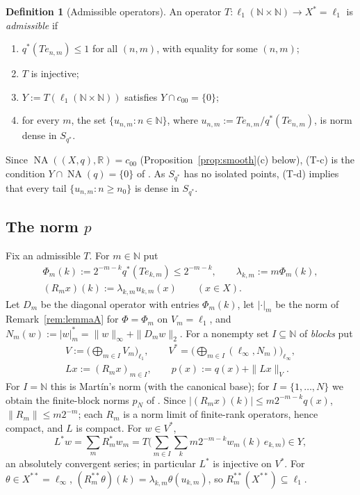 \documentclass[10pt]{amsart}
\theoremstyle{definition}
\newtheorem{definition}[theorem]{Definition}
\theoremstyle{remark}
\newcommand{\NA}{\operatorname{NA}}
\newcommand{\R}{\mathbb R}
\newcommand{\N}{\mathbb N}
\begin{document}
\begin{definition}[Admissible operators]\label{def:admissible}
An operator $T:\ell_1(\N\times\N)\to X^*=\ell_1$ is \emph{admissible} if
\begin{enumerate}
\item[(T-a)] $q^*(Te_{n,m})\le1$ for all $(n,m)$, with equality for some
$(n,m)$;
\item[(T-b)] $T$ is injective;
\item[(T-c)] $Y:=T(\ell_1(\N\times\N))$ satisfies $Y\cap c_{00}=\{0\}$;
\item[(T-d)] for every $m$, the set $\{u_{n,m}:n\in\N\}$, where
$u_{n,m}:=Te_{n,m}/q^*(Te_{n,m})$, is norm dense in $S_{q^*}$.
\end{enumerate}
\end{definition}

Since $\NA((X,q),\R)=c_{00}$ (Proposition~\ref{prop:smooth}(c) below),
(T-c) is the condition $Y\cap\NA(q)=\{0\}$ of \cite{Martin}.  As $S_{q^*}$
has no isolated points, (T-d) implies that every tail
$\{u_{n,m}:n\geq n_0\}$ is dense in $S_{q^*}$.

\subsection{The norm $p$}
Fix an admissible $T$.  For $m\in\N$ put
\begin{gather*}
 \Phi_m(k):=2^{-m-k}q^*(Te_{k,m})\le 2^{-m-k},\qquad
 \lambda_{k,m}:=m\Phi_m(k),\\
 (R_mx)(k):=\lambda_{k,m}u_{k,m}(x)\qquad(x\in X).
\end{gather*}
Let $D_m$ be the diagonal operator with entries $\Phi_m(k)$, let
$|\cdot|_m$ be the norm of Remark~\ref{rem:lemmaA} for $\Phi=\Phi_m$ on
$V_m=\ell_1$, and $N_m(w):=|w|_m^*=\|w\|_\infty+\|D_mw\|_2$.  For a nonempty
set $I\subseteq\N$ of \emph{blocks} put
\begin{gather*}
 V:=\Big(\bigoplus_{m\in I}V_m\Big)_{\ell_1},\qquad
 V^*=\Big(\bigoplus_{m\in I}(\ell_\infty,N_m)\Big)_{\ell_\infty},\\
 Lx:=(R_mx)_{m\in I},\qquad p(x):=q(x)+\|Lx\|_V .
\end{gather*}
For $I=\N$ this is Mart\'in's norm (with the canonical base); for
$I=\{1,\dots,N\}$ we obtain the finite-block norms $p_N$ of \cite{PrB}.
Since $|(R_mx)(k)|\le m2^{-m-k}q(x)$, $\|R_m\|\leq m2^{-m}$; each $R_m$ is a
norm limit of finite-rank operators, hence compact, and $L$ is compact.
For $w\in V^*$,
\begin{equation}\label{eq:Lstar}
 L^*w=\sum_mR_m^*w_m=T\Big(\sum_{m\in I}\sum_k m2^{-m-k}w_m(k)\,e_{k,m}\Big)\in Y,
\end{equation}
an absolutely convergent series; in particular $L^*$ is injective on
$V^*$.  For $\theta\in X^{**}=\ell_\infty$,
$(R_m^{**}\theta)(k)=\lambda_{k,m}\theta(u_{k,m})$, so
$R_m^{**}(X^{**})\subseteq\ell_1$.
\end{document}

